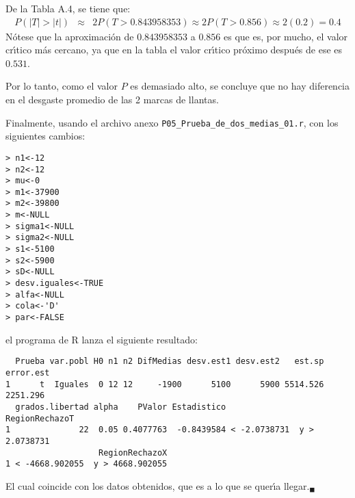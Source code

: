 \begin{solucion}
 \begin{valorp}
  De la Tabla A.4, se tiene que:
  \begin{eqnarray*}
   P(|T|>|t|) & \approx & 2P(T > 0.843958353) \approx 2P(T > 0.856)
   \approx 2(0.2) = 0.4
  \end{eqnarray*}
  N\'otese que la aproximaci\'on de $0.843958353$ a $0.856$ es que es,
  por mucho, el valor cr\'{\i}tico m\'as cercano,
  ya que en la tabla el valor cr\'{\i}tico pr\'oximo despu\'es de ese
  es $0.531$.
 \end{valorp}

 \begin{conclusion}
  Por lo tanto, como el valor $P$ es demasiado alto, se concluye
  que no hay diferencia en el desgaste promedio
  de las 2 marcas de llantas.
 \end{conclusion}

 Finalmente, usando el archivo anexo
 \texttt{P05\_Prueba\_de\_dos\_medias\_01.r},
 con los siguientes cambios:
 \begin{verbatim}
> n1<-12
> n2<-12
> mu<-0
> m1<-37900
> m2<-39800
> m<-NULL
> sigma1<-NULL
> sigma2<-NULL
> s1<-5100
> s2<-5900
> sD<-NULL
> desv.iguales<-TRUE
> alfa<-NULL
> cola<-'D'
> par<-FALSE
 \end{verbatim}
 \vspace{-0.5cm}
 el programa de R lanza el siguiente resultado:
 \begin{verbatim}
  Prueba var.pobl H0 n1 n2 DifMedias desv.est1 desv.est2   est.sp error.est
1      t  Iguales  0 12 12     -1900      5100      5900 5514.526  2251.296
  grados.libertad alpha    PValor Estadistico              RegionRechazoT
1              22  0.05 0.4077763  -0.8439584 < -2.0738731  y > 2.0738731
                   RegionRechazoX
1 < -4668.902055  y > 4668.902055
 \end{verbatim}
 \vspace{-0.5cm}
 El cual coincide con los datos obtenidos,
 que es a lo que se quer\'{\i}a llegar.${}_{\blacksquare}$
\end{solucion}
